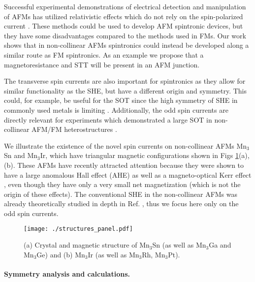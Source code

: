 \documentclass[aps,prl,reprint,amsmath,amssymb,superscriptaddress]{revtex4-1}
\begin{document}
Successful experimental demonstrations of electrical detection and manipulation of AFMs has utilized relativistic effects which do not rely on the spin-polarized current \cite{Park2011,Fina2014,Wang2014,Kriegner2016,Wadley2016,Zelezny14,Wadley2016}. These methods could be used to develop AFM spintronic devices, but they have some disadvantages compared to the methods used in FMs. Our work shows that in non-collinear AFMs spintronics could instead be developed along a similar route as FM spintronics. As an example we propose that a magnetoresistance and STT will be present in an AFM junction.

The transverse spin currents are also important for spintronics as they allow for similar functionality as the SHE, but have a different origin and symmetry. This could, for example, be useful for the SOT since the high symmetry of SHE in commonly used metals is limiting \cite{MacNeill2016}. Additionally, the odd spin currents are directly relevant for experiments which demonstrated a large SOT in non-collinear AFM/FM heterostructures \cite{Tshitoyan2015,Reichlova2015,Zhang2016,Oh2016,Wu2016}.

We illustrate the existence of the novel spin currents on non-collinear AFMs Mn$_3$Sn and Mn$_3$Ir, which have triangular magnetic configurations shown in Figs \ref{fig:structures}(a),(b). These AFMs have recently attracted attention because they were shown to have a large anomalous Hall effect (AHE) \cite{Chen2014,Kubler2014,Nakatsuji2015,Nayak2016} as well as a magneto-optical Kerr effect \cite{Feng2015}, even though they have only a very small net magnetization (which is not the origin of these effects). The conventional SHE in the non-collinear AFMs was already theoretically studied in depth in Ref. \cite{YangZhang2017}, thus we focus here only on the odd spin currents. 

\begin{figure}[h]
  \centering
  \texttt{[image: ./structures\_panel.pdf]}
  \caption{(a) Crystal and magnetic structure of Mn$_3$Sn (as well as Mn$_3$Ga and Mn$_3$Ge) and (b)  Mn$_3$Ir (as well as Mn$_3$Rh, Mn$_3$Pt).}
  \label{fig:structures}
\end{figure}

\paragraph{Symmetry analysis and calculations.}
\end{document}
